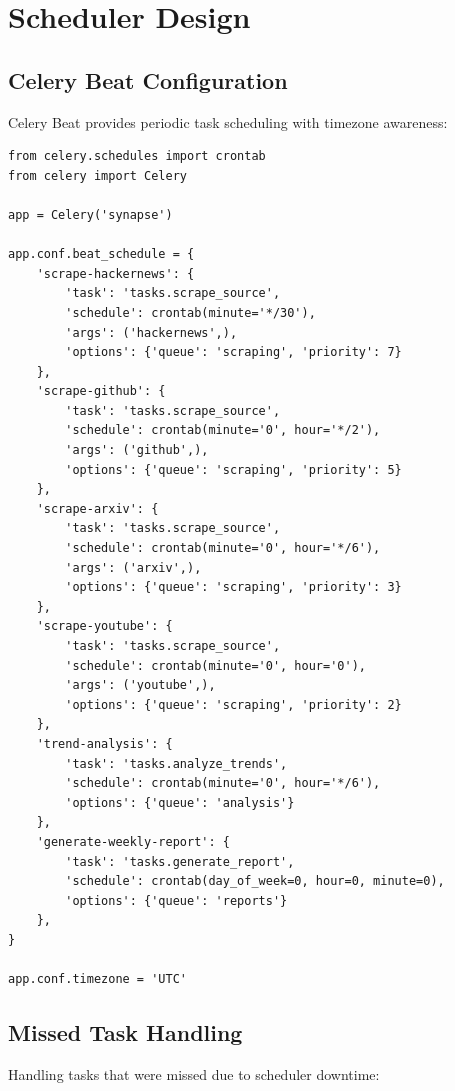 \documentclass[12pt,a4paper]{report}
\begin{document}
\chapter{Scheduler Design}

\section{Celery Beat Configuration}

Celery Beat provides periodic task scheduling with timezone awareness:

\begin{lstlisting}
from celery.schedules import crontab
from celery import Celery

app = Celery('synapse')

app.conf.beat_schedule = {
    'scrape-hackernews': {
        'task': 'tasks.scrape_source',
        'schedule': crontab(minute='*/30'),
        'args': ('hackernews',),
        'options': {'queue': 'scraping', 'priority': 7}
    },
    'scrape-github': {
        'task': 'tasks.scrape_source',
        'schedule': crontab(minute='0', hour='*/2'),
        'args': ('github',),
        'options': {'queue': 'scraping', 'priority': 5}
    },
    'scrape-arxiv': {
        'task': 'tasks.scrape_source',
        'schedule': crontab(minute='0', hour='*/6'),
        'args': ('arxiv',),
        'options': {'queue': 'scraping', 'priority': 3}
    },
    'scrape-youtube': {
        'task': 'tasks.scrape_source',
        'schedule': crontab(minute='0', hour='0'),
        'args': ('youtube',),
        'options': {'queue': 'scraping', 'priority': 2}
    },
    'trend-analysis': {
        'task': 'tasks.analyze_trends',
        'schedule': crontab(minute='0', hour='*/6'),
        'options': {'queue': 'analysis'}
    },
    'generate-weekly-report': {
        'task': 'tasks.generate_report',
        'schedule': crontab(day_of_week=0, hour=0, minute=0),
        'options': {'queue': 'reports'}
    },
}

app.conf.timezone = 'UTC'
\end{lstlisting}

\section{Missed Task Handling}

Handling tasks that were missed due to scheduler downtime:
\end{document}
